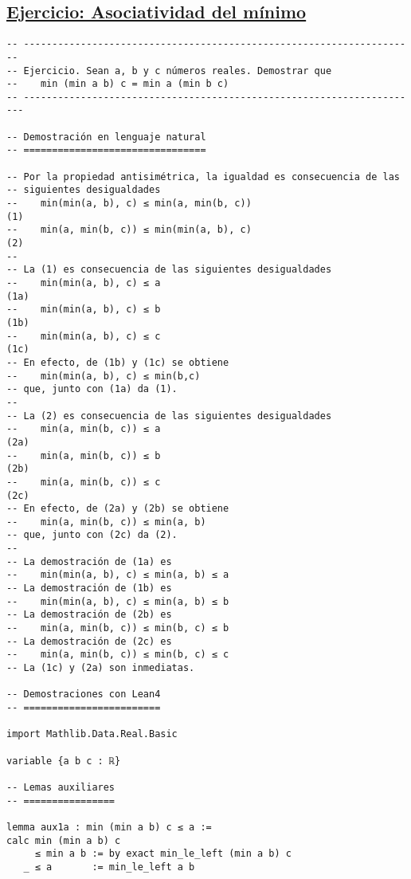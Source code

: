\subsection{\href{./src/Basicos/Asociatividad\_del\_minimo.lean}{Ejercicio: Asociatividad del mínimo}}
\label{sec:org49edf46}
\begin{verbatim}
-- ---------------------------------------------------------------------
-- Ejercicio. Sean a, b y c números reales. Demostrar que
--    min (min a b) c = min a (min b c)
-- ----------------------------------------------------------------------

-- Demostración en lenguaje natural
-- ================================

-- Por la propiedad antisimétrica, la igualdad es consecuencia de las
-- siguientes desigualdades
--    min(min(a, b), c) ≤ min(a, min(b, c))                           (1)
--    min(a, min(b, c)) ≤ min(min(a, b), c)                           (2)
--
-- La (1) es consecuencia de las siguientes desigualdades
--    min(min(a, b), c) ≤ a                                          (1a)
--    min(min(a, b), c) ≤ b                                          (1b)
--    min(min(a, b), c) ≤ c                                          (1c)
-- En efecto, de (1b) y (1c) se obtiene
--    min(min(a, b), c) ≤ min(b,c)
-- que, junto con (1a) da (1).
--
-- La (2) es consecuencia de las siguientes desigualdades
--    min(a, min(b, c)) ≤ a                                          (2a)
--    min(a, min(b, c)) ≤ b                                          (2b)
--    min(a, min(b, c)) ≤ c                                          (2c)
-- En efecto, de (2a) y (2b) se obtiene
--    min(a, min(b, c)) ≤ min(a, b)
-- que, junto con (2c) da (2).
--
-- La demostración de (1a) es
--    min(min(a, b), c) ≤ min(a, b) ≤ a
-- La demostración de (1b) es
--    min(min(a, b), c) ≤ min(a, b) ≤ b
-- La demostración de (2b) es
--    min(a, min(b, c)) ≤ min(b, c) ≤ b
-- La demostración de (2c) es
--    min(a, min(b, c)) ≤ min(b, c) ≤ c
-- La (1c) y (2a) son inmediatas.

-- Demostraciones con Lean4
-- ========================

import Mathlib.Data.Real.Basic

variable {a b c : ℝ}

-- Lemas auxiliares
-- ================

lemma aux1a : min (min a b) c ≤ a :=
calc min (min a b) c
     ≤ min a b := by exact min_le_left (min a b) c
   _ ≤ a       := min_le_left a b


\end{verbatim}
